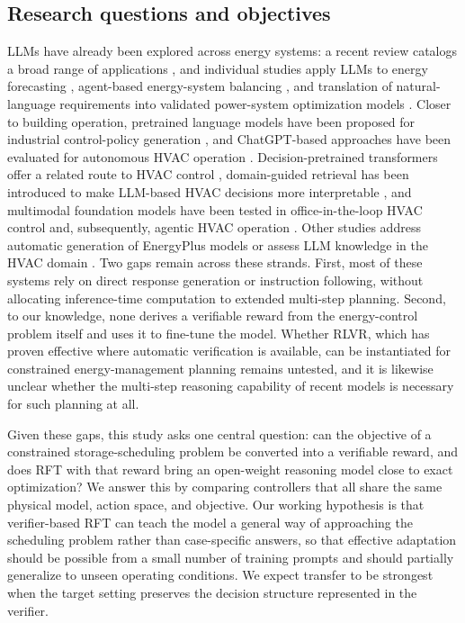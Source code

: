 \documentclass[11pt]{article}
\begin{document}
\subsection{Research questions and objectives}\label{subsec:gap-objectives}
LLMs have already been explored across energy systems: a recent review catalogs a broad range of applications \cite{ref:mirshekali2025_llm_energy_systems_review}, and individual studies apply LLMs to energy forecasting \cite{ref:qiu2024_ef_llm}, agent-based energy-system balancing \cite{ref:ren2025_llm_balance_energy_systems}, and translation of natural-language requirements into validated power-system optimization models \cite{ref:hu2025_solver_ready_power_system_optimization}. Closer to building operation, pretrained language models have been proposed for industrial control-policy generation \cite{ref:song2023_pretrained_llm_industrial_control}, and ChatGPT-based approaches have been evaluated for autonomous HVAC operation \cite{ref:ahn2023_chatgpt_hvac}. Decision-pretrained transformers offer a related route to HVAC control \cite{ref:berkes2024_hvac_dpt}, domain-guided retrieval has been introduced to make LLM-based HVAC decisions more interpretable \cite{ref:kojain2025_darlin}, and multimodal foundation models have been tested in office-in-the-loop HVAC control \cite{ref:sawada2024_office_in_the_loop} and, subsequently, agentic HVAC operation \cite{ref:sawada2025_agentic_ai_dce}. Other studies address automatic generation of EnergyPlus models \cite{ref:jiang2024_eplus_llm} or assess LLM knowledge in the HVAC domain \cite{ref:lu2024_ashrae_exam_llm}. Two gaps remain across these strands. First, most of these systems rely on direct response generation or instruction following, without allocating inference-time computation to extended multi-step planning. Second, to our knowledge, none derives a verifiable reward from the energy-control problem itself and uses it to fine-tune the model. Whether RLVR, which has proven effective where automatic verification is available, can be instantiated for constrained energy-management planning remains untested, and it is likewise unclear whether the multi-step reasoning capability of recent models is necessary for such planning at all.

Given these gaps, this study asks one central question: can the objective of a constrained storage-scheduling problem be converted into a verifiable reward, and does RFT with that reward bring an open-weight reasoning model close to exact optimization? We answer this by comparing controllers that all share the same physical model, action space, and objective. Our working hypothesis is that verifier-based RFT can teach the model a general way of approaching the scheduling problem rather than case-specific answers, so that effective adaptation should be possible from a small number of training prompts and should partially generalize to unseen operating conditions. We expect transfer to be strongest when the target setting preserves the decision structure represented in the verifier.
\end{document}
